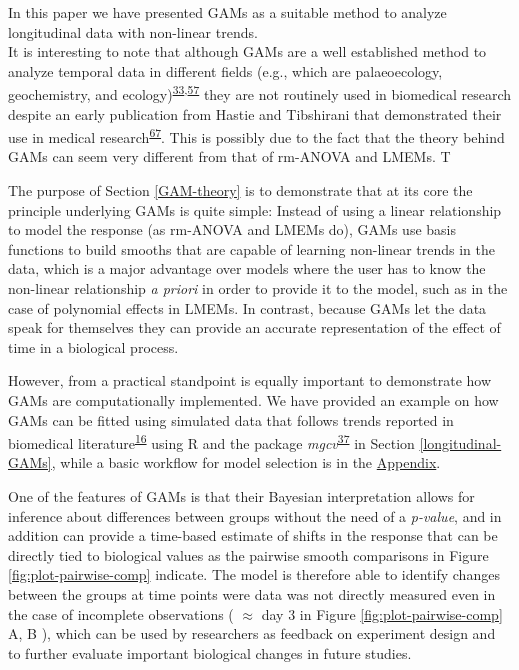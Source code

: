 \documentclass[
]{article}
\begin{document}
In this paper we have presented GAMs as a suitable method to analyze longitudinal data with non-linear trends.\\
It is interesting to note that although GAMs are a well established method to analyze temporal data in different fields (e.g., which are palaeoecology, geochemistry, and ecology)\textsuperscript{\protect\hyperlink{ref-pedersen2019}{33},\protect\hyperlink{ref-hefley2017}{57}} they are not routinely used in biomedical research despite an early publication from Hastie and Tibshirani that demonstrated their use in medical research\textsuperscript{\protect\hyperlink{ref-hastie1995}{67}}. This is possibly due to the fact that the theory behind GAMs can seem very different from that of rm-ANOVA and LMEMs. T

The purpose of Section \ref{GAM-theory} is to demonstrate that at its core the principle underlying GAMs is quite simple: Instead of using a linear relationship to model the response (as rm-ANOVA and LMEMs do), GAMs use basis functions to build smooths that are capable of learning non-linear trends in the data, which is a major advantage over models where the user has to know the non-linear relationship \emph{a priori} in order to provide it to the model, such as in the case of polynomial effects in LMEMs. In contrast, because GAMs let the data speak for themselves they can provide an accurate representation of the effect of time in a biological process.

However, from a practical standpoint is equally important to demonstrate how GAMs are computationally implemented. We have provided an example on how GAMs can be fitted using simulated data that follows trends reported in biomedical literature\textsuperscript{\protect\hyperlink{ref-vishwanath2009}{16}} using R and the package \emph{mgcv}\textsuperscript{\protect\hyperlink{ref-wood2017}{37}} in Section \ref{longitudinal-GAMs}, while a basic workflow for model selection is in the \protect\hyperlink{workflow}{Appendix}.

One of the features of GAMs is that their Bayesian interpretation allows for inference about differences between groups without the need of a \emph{p-value}, and in addition can provide a time-based estimate of shifts in the response that can be directly tied to biological values as the pairwise smooth comparisons in Figure \ref{fig:plot-pairwise-comp} indicate. The model is therefore able to identify changes between the groups at time points were data was not directly measured even in the case of incomplete observations ( \(\approx\) day 3 in Figure \ref{fig:plot-pairwise-comp} A, B ), which can be used by researchers as feedback on experiment design and to further evaluate important biological changes in future studies.
\end{document}
